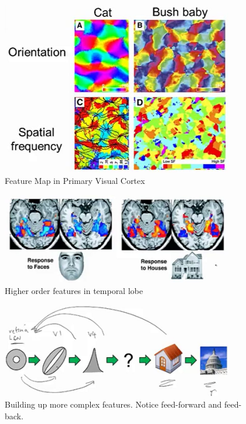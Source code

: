 \documentclass[]{article}
\begin{document}
\begin{figure}[H]
	\begin{center}
		\caption{Feature Map in Primary Visual Cortex}
		\includegraphics[width=0.9\textwidth]{feature-map}
	\end{center}
\end{figure}

\begin{figure}[H]
	\begin{center}
		\caption{Higher order features in temporal lobe}
		\includegraphics[width=0.9\textwidth]{higher-order-features}
	\end{center}
\end{figure}

\begin{figure}[H]
	\begin{center}
		\caption[Building up more complex features]{Building up more complex features. Notice feed-forward and feed-back.}
		\includegraphics[width=0.9\textwidth]{build}
	\end{center}
\end{figure}
\end{document}
